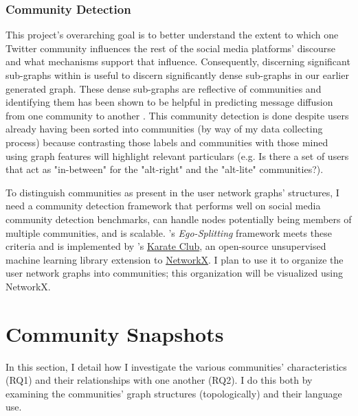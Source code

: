 \documentclass[acmlarge, screen, authorversion]{acmart}
\begin{document}


\subsubsection{Community Detection}

This project's overarching goal is to better understand the extent to which one
Twitter community influences the rest of the social media platforms' discourse
and what mechanisms support that influence. Consequently, discerning significant
sub-graphs within is useful to discern significantly dense sub-graphs in our
earlier generated graph. These dense sub-graphs are reflective of communities
and identifying them has been shown to be helpful in predicting message
diffusion from one community to another \cite{wengViralityPredictionCommunity2013}. This community detection
is done despite users already having been sorted into communities (by way of my
data collecting process) because contrasting those labels and communities with
those mined using graph features will highlight relevant particulars (e.g. Is
there a set of users that act as "in-between" for the "alt-right" and the
"alt-lite" communities?).

To distinguish communities as present in the user network graphs' structures, I
need a community detection framework that performs well on social media
community detection benchmarks, can handle nodes potentially being members of
multiple communities, and is scalable.
\citet{epastoEgoSplittingFrameworkNonOverlapping2017}'s \textit{Ego-Splitting}
framework meets these criteria and is implemented by
\citet{rozemberczkiAPIOrientedOpensource2020}'s
\href{https://github.com/benedekrozemberczki/karateclub}{Karate Club}, an
open-source unsupervised machine learning library extension to
\href{https://networkx.github.io/}{NetworkX}. I plan to use it to organize the
user network graphs into communities; this organization will be visualized using
NetworkX.

\section{Community Snapshots}

In this section, I detail how I investigate the various communities' characteristics (RQ1) and their relationships with one another (RQ2). I do this both by examining the communities' graph structures (topologically) and their language use.
\end{document}
